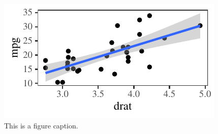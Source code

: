 \documentclass[
  a4paper,
  11pt,
  twocolumn]{article}
\begin{document}
\begin{figure}[!h]
\caption{This is a figure caption.}\label{fig:ex_plot}


\begin{center}\includegraphics{main_files/figure-latex/ex_plot-1} \end{center}

\end{figure}




\theendnotes
\end{document}
